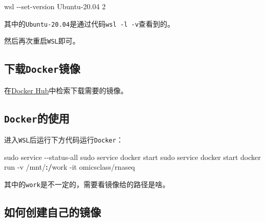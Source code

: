 \documentclass[
  10pt,
]{book}
\newenvironment{Shaded}{\begin{snugshade}}{\end{snugshade}}
\newcommand{\DecValTok}[1]{\textcolor[rgb]{0.00,0.00,0.81}{#1}}
\newcommand{\ErrorTok}[1]{\textcolor[rgb]{0.64,0.00,0.00}{\textbf{#1}}}
\newcommand{\FloatTok}[1]{\textcolor[rgb]{0.00,0.00,0.81}{#1}}
\newcommand{\NormalTok}[1]{#1}
\newcommand{\SpecialCharTok}[1]{\textcolor[rgb]{0.00,0.00,0.00}{#1}}
\begin{document}
\begin{Shaded}
\begin{Highlighting}[]
\NormalTok{wsl }\SpecialCharTok{{-}{-}}\NormalTok{set}\SpecialCharTok{{-}}\NormalTok{version Ubuntu}\FloatTok{{-}20.04} \DecValTok{2}
\end{Highlighting}
\end{Shaded}

其中的\texttt{Ubuntu-20.04}是通过代码\texttt{wsl\ -l\ -v}查看到的。

然后再次重启\texttt{WSL}即可。

\hypertarget{ux4e0bux8f7ddockerux955cux50cf}{%
\subsection{\texorpdfstring{下载\texttt{Docker}镜像}{下载Docker镜像}}\label{ux4e0bux8f7ddockerux955cux50cf}}

在\href{https://hub.docker.com/}{Docker Hub}中检索下载需要的镜像。

\hypertarget{dockerux7684ux4f7fux7528-1}{%
\subsection{\texorpdfstring{\texttt{Docker}的使用}{Docker的使用}}\label{dockerux7684ux4f7fux7528-1}}

进入\texttt{WSL}后运行下方代码运行\texttt{Docker}：

\begin{Shaded}
\begin{Highlighting}[]
\NormalTok{sudo service }\SpecialCharTok{{-}{-}}\NormalTok{status}\SpecialCharTok{{-}}\NormalTok{all }
\NormalTok{sudo service docker start}
\NormalTok{sudo service docker start}
\NormalTok{docker run }\SpecialCharTok{{-}}\NormalTok{v }\SpecialCharTok{/}\NormalTok{mnt}\SpecialCharTok{/}\ErrorTok{:/}\NormalTok{work }\SpecialCharTok{{-}}\NormalTok{it omicsclass}\SpecialCharTok{/}\NormalTok{rnaseq}
\end{Highlighting}
\end{Shaded}

其中的\texttt{work}是不一定的，需要看镜像给的路径是啥。

\hypertarget{ux5982ux4f55ux521bux5efaux81eaux5df1ux7684ux955cux50cf}{%
\subsection{如何创建自己的镜像}\label{ux5982ux4f55ux521bux5efaux81eaux5df1ux7684ux955cux50cf}}
\end{document}
